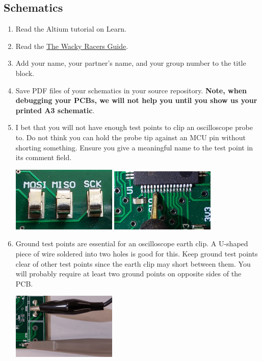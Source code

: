 \documentclass[11pt, a4paper]{article}
\newcommand{\theguide}{\href{https://eng-git.canterbury.ac.nz/wacky-racers/wacky-racers/-/blob/master/doc/guide/guide.pdf}{The Wacky Racers Guide}}
\begin{document}
\subsection{Schematics}

\begin{enumerate}
\item Read the Altium tutorial on Learn.

\item Read the \theguide.

\item Add your name, your partner's name, and your group number to the
  title block.

\item Save PDF files of your schematics in your source repository.
  \textbf{Note, when debugging your PCBs, we will not help you until
    you show us your printed A3 schematic}.

\item I bet that you will not have enough test points to clip an
  oscilloscope probe to.  Do not think you can hold the probe tip
  against an MCU pin without shorting something.  Ensure you give a
  meaningful name to the test point in its comment field.

  \includegraphics[width=5cm]{../guide/figs/testpoints.jpg}  \includegraphics[width=5cm]{../guide/figs/micro_probe_zoom.jpg}

\item Ground test points are essential for an oscilloscope earth clip.
  A U-shaped piece of wire soldered into two holes is good for this.
  Keep ground test points clear of other test points since the earth
  clip may short between them.  You will probably require at least two
  ground points on opposite sides of the PCB.

\includegraphics[width=5cm]{../guide/figs/scope_probe_testpoints.jpg}


\end{enumerate}
\end{document}
